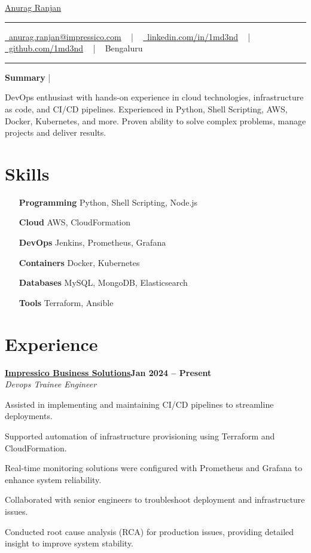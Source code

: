 \documentclass[letterpaper,10pt]{article}
\newcommand{\documentTitle}[2]{
  \begin{center}
    {\Huge\color{accentTitle} #1}
    \vspace{10pt}
    {\color{accentLine} \hrule}
    \vspace{2pt}
    \footnotesize{#2}
    \vspace{2pt}
    {\color{accentLine} \hrule}
  \end{center}
}
\newcommand{\tinysection}[1]{
  \phantomsection
  \addcontentsline{toc}{section}{#1}
  {\large{\bfseries\color{accentText}#1} {\color{accentLine} |}}
}
\newcommand{\heading}[2]{
  \hspace{10pt}#1\hfill#2\\
}
\newcommand{\headingBf}[2]{
  \heading{\textbf{#1}}{\textbf{#2}}
}
\newcommand{\headingIt}[2]{
  \heading{\textit{#1}}{\textit{#2}}
}
\newenvironment{resume_list}{
  \vspace{-7pt}
  \begin{itemize}[itemsep=-2px, parsep=1pt, leftmargin=30pt]
}{
  \end{itemize}
}
\begin{document}
\documentTitle{\href{https://1md3nd.com}{Anurag Ranjan}}{
  \href{mailto:anurag.ranjan@impressico.com}{\raisebox{-0.15\height} 
  \faEnvelope\ anurag.ranjan@impressico.com} ~ | ~
  \href{https://linkedin.com/in/1md3nd}{\raisebox{-0.15\height} \faLinkedin\ linkedin.com/in/1md3nd} ~ | ~
  \href{https://github.com/1md3nd}{\raisebox{-0.15\height} \faGithub\ github.com/1md3nd} ~ | ~
  Bengaluru
}
\tinysection{Summary}
DevOps enthusiast with hands-on experience in cloud technologies, infrastructure as code, and CI/CD pipelines. Experienced in Python, Shell Scripting, AWS, Docker, Kubernetes, and more. Proven ability to solve complex problems, manage projects and deliver results.

\section{Skills}
\begin{multicols}{2}
  \begin{itemize}[itemsep=-2px, parsep=1pt, leftmargin=75pt]
    \item[\textbf{Programming}] Python, Shell Scripting, Node.js
    \item[\textbf{Cloud}] AWS, CloudFormation
    \item[\textbf{DevOps}] Jenkins, Prometheus, Grafana
    \item[\textbf{Containers}] Docker, Kubernetes
    \item[\textbf{Databases}] MySQL, MongoDB, Elasticsearch
    \item[\textbf{Tools}] Terraform, Ansible
  \end{itemize}
\end{multicols}

\section{Experience}

\headingBf{\href {https://www.impressico.com}{Impressico Business Solutions}}{Jan 2024 -- Present}  
\headingIt{Devops Trainee Engineer}{}  
\begin{resume_list}  
  \item Assisted in implementing and maintaining CI/CD pipelines to streamline deployments.  
  \item Supported automation of infrastructure provisioning using Terraform and CloudFormation.  
  \item Real-time monitoring solutions were configured with Prometheus and Grafana to enhance system reliability.  
  \item Collaborated with senior engineers to troubleshoot deployment and infrastructure issues.
  \item Conducted root cause analysis (RCA) for production issues, providing detailed insight to improve system stability.
\end{resume_list}
\end{document}
